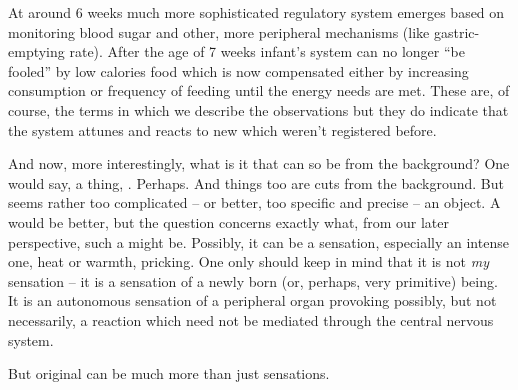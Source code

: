 At around 6 weeks much more sophisticated regulatory
system emerges based on monitoring blood sugar and other, more peripheral
mechanisms (like gastric-emptying rate). After the age of 7 weeks infant's
system can no longer ``be fooled'' by low calories food which is now compensated
either by increasing consumption or frequency of feeding until the energy needs
are met. These are, of course, the terms in which we describe the observations
but they do indicate that the system attunes and reacts to new 
which weren't registered before.

 
\pa\label{pa:distwhat} And now, more interestingly, what is it that can so be
 from the background? One would say, a thing, . Perhaps. And things too are {cuts} from the background. But
 seems rather too complicated -- or better, too specific
and precise -- an object. A  would be better, but the question
concerns exactly what, from our later perspective, such a  might be.
Possibly, it can be a sensation, especially an intense one, heat or warmth,
pricking. One only should keep in mind that it is not {\em my} sensation -- it
is a sensation of a newly born (or, perhaps, very primitive) being.  It is an
autonomous sensation of a peripheral organ provoking possibly, but not
necessarily, a reaction which need not be mediated through the central nervous
system.

\label{sub:psychexa}
But original  can be much more than just sensations.

